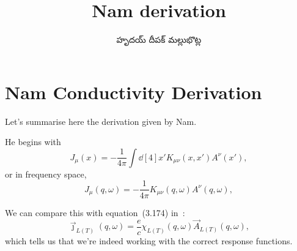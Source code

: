 \documentclass[../main.tex]{subfiles}
\title{Nam derivation}
\author{\begin{telugu}హృదయ్ దీపక్ మల్లుభొట్ల\end{telugu}}
\date{}
\begin{document}
	\onlyinsubfile{\maketitle}
	\section{Nam Conductivity Derivation} \label{sec:Nam}
	Let's summarise here the derivation given by Nam\supercite{Nam1967}.

	He begins with
	\begin{equation}
		J_\mu(x) = - \frac{1}{4\pi}\int \dd[4]{x'} K_{\mu\nu}(x, x') A^\nu(x'),
	\end{equation}
	or in frequency space,
	\begin{equation}
		J_\mu(q, \omega) = - \frac{1}{4\pi} K_{\mu\nu}(q, \omega) A^\nu(q, \omega),
	\end{equation}

	We can compare this with equation~(3.174) in~\cite{Giuliani2005}:
	\begin{equation}
		\vec{\jmath}_{L(T)}(q, \omega) = \frac{e}{c} \chi_{L(T)}(q, \omega) \vec{A}_{L(T)}(q, \omega),
	\end{equation}
	which tells us that we're indeed working with the correct response functions.
\end{document}
